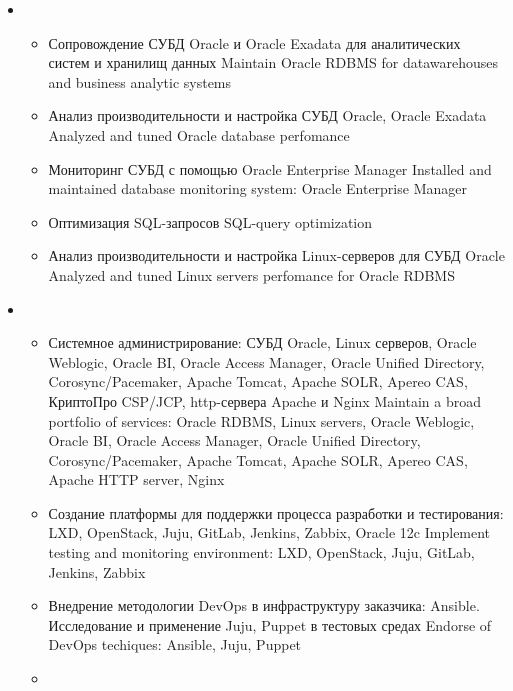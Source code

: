 \documentclass[11pt,a4paper,sans]{moderncv}        %
\begin{document}
{\begin{itemize}
\begin{itemize}
		\end{itemize}
	\item {}
		\begin{itemize}
			\item {}
				{Сопровождение СУБД Oracle и Oracle Exadata для аналитических систем и хранилищ данных}
				{Maintain Oracle RDBMS for datawarehouses and business analytic systems}
			\item {}
				{Анализ производительности и настройка СУБД Oracle, Oracle Exadata}
				{Analyzed and tuned Oracle database perfomance}
			\item {}
				{Мониторинг СУБД с помощью Oracle Enterprise Manager}
				{Installed and maintained database monitoring system: Oracle Enterprise Manager}
			\item {}
				{Оптимизация SQL-запросов}
				{SQL-query optimization}
			\item {}
				{Анализ производительности и настройка Linux-серверов для СУБД Oracle}
				{Analyzed and tuned Linux servers perfomance for Oracle RDBMS}
		\end{itemize}
	\item {}
		\begin{itemize}
			\item {}
				{Системное администрирование: СУБД Oracle, Linux серверов, Oracle Weblogic, Oracle BI, Oracle Access Manager, Oracle Unified Directory,
				Corosync/Pacemaker, Apache Tomcat, Apache SOLR, Apereo CAS, КриптоПро CSP/JCP, http-сервера Apache и Nginx}
				{Maintain a broad portfolio of services: Oracle RDBMS, Linux servers, Oracle Weblogic, Oracle BI, Oracle Access Manager, Oracle Unified Directory, Corosync/Pacemaker, Apache Tomcat, Apache SOLR, Apereo CAS, Apache HTTP server, Nginx}
			\item {}
				{Создание платформы для поддержки процесса разработки и тестирования: LXD, OpenStack, Juju, GitLab, Jenkins, Zabbix, Oracle 12c}
				{Implement testing and monitoring environment: LXD, OpenStack, Juju, GitLab, Jenkins, Zabbix}
			\item {}
				{Внедрение методологии DevOps в инфраструктуру заказчика: Ansible. Исследование и применение Juju, Puppet в тестовых средах}
				{Endorse of DevOps techiques: Ansible, Juju, Puppet}
			\item {}

\end{itemize}
\end{itemize}}
\end{document}
